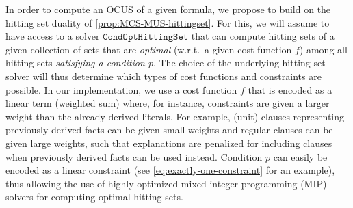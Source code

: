 \documentclass[twoside,11pt]{article}
\newcommand\mm[1]{\ensuremath{#1}\xspace}
\newcommand\call[1]{\mm{\texttt{#1}}}
\newcommand\cohs{\mm{\call{CondOptHittingSet}}}
\begin{document}
In order to compute an OCUS of a given formula, we propose to build on the hitting set duality of \cref{prop:MCS-MUS-hittingset}. 
For this, we will assume to have access to a solver \cohs that can compute hitting sets of a given collection of sets that are \emph{optimal} (w.r.t.\ a given cost function $f$) among all hitting sets \emph{satisfying a condition $p$}. 
The choice of the underlying hitting set solver will thus determine which types of cost functions and constraints are possible. 
In our implementation, we use a cost function $f$ that is encoded as a linear term (weighted sum) where, for instance, constraints are given a larger weight than the already derived literals. 
For example, (unit) clauses representing previously derived facts can be given small weights and regular clauses can be given large weights, such that explanations are penalized for including clauses when previously derived facts can be used instead. %
Condition $p$ can easily be encoded as a linear constraint (see \cref{eq:exactly-one-constraint} for an example), 
thus allowing the use of highly optimized mixed integer programming (MIP) solvers for computing optimal hitting sets. 
\end{document}
